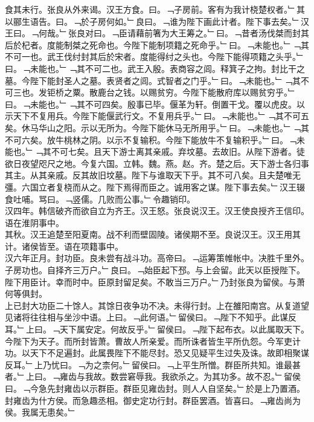 \documentclass{zhvt-classic}
\begin{document}
\hspace*{2em}食其未行。张良从外来谒。汉王方食。曰。﹁子房前。客有为我计桡楚权者。﹂其以郦生语告。曰。﹁於子房何如。﹂良曰。﹁谁为陛下画此计者。陛下事去矣。﹂汉王曰。﹁何哉。﹂张良对曰。﹁臣请藉前箸为大王筹之。﹂曰。﹁昔者汤伐桀而封其后於杞者。度能制桀之死命也。今陛下能制项籍之死命乎。﹂曰。﹁未能也。﹂﹁其不可一也。武王伐纣封其后於宋者。度能得纣之头也。今陛下能得项籍之头乎。﹂曰。﹁未能也。﹂﹁其不可二也。武王入殷。表商容之闾。释箕子之拘。封比干之墓。今陛下能封圣人之墓。表贤者之闾。式智者之门乎。﹂曰。﹁未能也。﹂﹁其不可三也。发钜桥之粟。散鹿台之钱。以赐贫穷。今陛下能散府库以赐贫穷乎。﹂曰。﹁未能也。﹂﹁其不可四矣。殷事已毕。偃革为轩。倒置干戈。覆以虎皮。以示天下不复用兵。今陛下能偃武行文。不复用兵乎。﹂曰。﹁未能也。﹂﹁其不可五矣。休马华山之阳。示以无所为。今陛下能休马无所用乎。﹂曰。﹁未能也。﹂﹁其不可六矣。放牛桃林之阴。以示不复输积。今陛下能放牛不复输积乎。﹂曰。﹁未能也。﹂﹁其不可七矣。且天下游士离其亲戚。弃坟墓。去故旧。从陛下游者。徒欲日夜望咫尺之地。今复六国。立韩。魏。燕。赵。齐。楚之后。天下游士各归事其主。从其亲戚。反其故旧坟墓。陛下与谁取天下乎。其不可八矣。且夫楚唯无彊。六国立者复桡而从之。陛下焉得而臣之。诚用客之谋。陛下事去矣。﹂汉王辍食吐哺。骂曰。﹁竖儒。几败而公事。﹂令趣销印。\\
\hspace*{2em}汉四年。韩信破齐而欲自立为齐王。汉王怒。张良说汉王。汉王使良授齐王信印。语在淮阴事中。\\
\hspace*{2em}其秋。汉王追楚至阳夏南。战不利而壁固陵。诸侯期不至。良说汉王。汉王用其计。诸侯皆至。语在项籍事中。\\
\hspace*{2em}汉六年正月。封功臣。良未尝有战斗功。高帝曰。﹁运筹策帷帐中。决胜千里外。子房功也。自择齐三万户。﹂良曰。﹁始臣起下邳。与上会留。此天以臣授陛下。陛下用臣计。幸而时中。臣原封留足矣。不敢当三万户。﹂乃封张良为留侯。与萧何等俱封。\\
\hspace*{2em}上已封大功臣二十馀人。其馀日夜争功不决。未得行封。上在雒阳南宫。从复道望见诸将往往相与坐沙中语。上曰。﹁此何语。﹂留侯曰。﹁陛下不知乎。此谋反耳。﹂上曰。﹁天下属安定。何故反乎。﹂留侯曰。﹁陛下起布衣。以此属取天下。今陛下为天子。而所封皆萧。曹故人所亲爱。而所诛者皆生平所仇怨。今军吏计功。以天下不足遍封。此属畏陛下不能尽封。恐又见疑平生过失及诛。故即相聚谋反耳。﹂上乃忧曰。﹁为之柰何。﹂留侯曰。﹁上平生所憎。群臣所共知。谁最甚者。﹂上曰。﹁雍齿与我故。数尝窘辱我。我欲杀之。为其功多。故不忍。﹂留侯曰。﹁今急先封雍齿以示群臣。群臣见雍齿封。则人人自坚矣。﹂於是上乃置酒。封雍齿为什方侯。而急趣丞相。御史定功行封。群臣罢酒。皆喜曰。﹁雍齿尚为侯。我属无患矣。﹂\\
\end{document}
